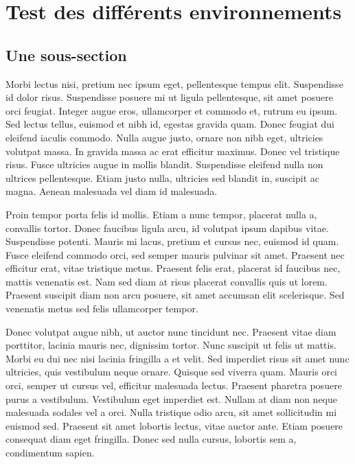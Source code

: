 \documentclass[10pt,fleqn]{article} %
\begin{document}
\section{Test des différents environnements }
\subsection{Une sous-section}
\begin{defi}
Morbi lectus nisi, pretium nec ipsum eget, pellentesque tempus elit. Suspendisse id dolor risus. Suspendisse posuere mi ut ligula pellentesque, sit amet posuere orci feugiat. Integer augue eros, ullamcorper et commodo et, rutrum eu ipsum. Sed lectus tellus, euismod et nibh id, egestas gravida quam. Donec feugiat dui eleifend iaculis commodo. Nulla augue justo, ornare non nibh eget, ultricies volutpat massa. In gravida massa ac erat efficitur maximus. Donec vel tristique risus. Fusce ultricies augue in mollis blandit. Suspendisse eleifend nulla non ultrices pellentesque. Etiam justo nulla, ultricies sed blandit in, suscipit ac magna. Aenean malesuada vel diam id malesuada.
\end{defi}

\begin{definition}
Proin tempor porta felis id mollis. Etiam a nunc tempor, placerat nulla a, convallis tortor. Donec faucibus ligula arcu, id volutpat ipsum dapibus vitae. Suspendisse potenti. Mauris mi lacus, pretium et cursus nec, euismod id quam. Fusce eleifend commodo orci, sed semper mauris pulvinar sit amet. Praesent nec efficitur erat, vitae tristique metus. Praesent felis erat, placerat id faucibus nec, mattis venenatis est. Nam sed diam at risus placerat convallis quis ut lorem. Praesent suscipit diam non arcu posuere, sit amet accumsan elit scelerisque. Sed venenatis metus sed felis ullamcorper tempor.
\end{definition}

\begin{hypo}
Donec volutpat augue nibh, ut auctor nunc tincidunt nec. Praesent vitae diam porttitor, lacinia mauris nec, dignissim tortor. Nunc suscipit ut felis ut mattis. Morbi eu dui nec nisi lacinia fringilla a et velit. Sed imperdiet risus sit amet nunc ultricies, quis vestibulum neque ornare. Quisque sed viverra quam. Mauris orci orci, semper ut cursus vel, efficitur malesuada lectus. Praesent pharetra posuere purus a vestibulum. Vestibulum eget imperdiet est. Nullam at diam non neque malesuada sodales vel a orci. Nulla tristique odio arcu, sit amet sollicitudin mi euismod sed. Praesent sit amet lobortis lectus, vitae auctor ante. Etiam posuere consequat diam eget fringilla. Donec sed nulla cursus, lobortis sem a, condimentum sapien.
\end{hypo}
\end{document}
